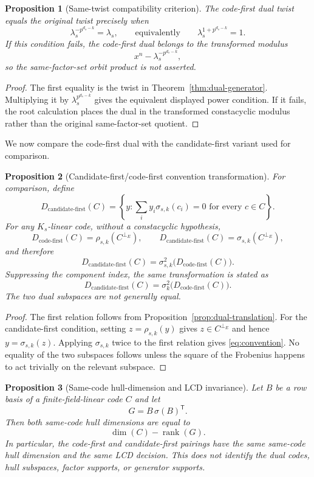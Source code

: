 \documentclass[11pt]{article}
\newcommand{\rank}{\operatorname{rank}}
\newcommand{\perpE}{\perp_E}
\newcommand{\CF}{\mathrm{code\text{-}first}}
\newcommand{\Candidate}{\mathrm{candidate\text{-}first}}
\theoremstyle{plain}
\newtheorem{proposition}{Proposition}
\theoremstyle{definition}
\theoremstyle{remark}
\begin{document}
\begin{proposition}[Same-twist compatibility criterion]\label{prop:same-twist}
The code-first dual twist equals the original twist precisely when
\[
\lambda_s^{-p^{d_s-k}}=\lambda_s,
\qquad\text{equivalently}\qquad
\lambda_s^{1+p^{d_s-k}}=1.
\]
If this condition fails, the code-first dual belongs to the transformed modulus
\[
x^n-\lambda_s^{-p^{d_s-k}},
\]
so the same-factor-set orbit product is not asserted.
\end{proposition}

\begin{proof}
The first equality is the twist in Theorem~\ref{thm:dual-generator}. Multiplying it by $\lambda_s^{p^{d_s-k}}$ gives the equivalent displayed power condition. If it fails, the root calculation places the dual in the transformed constacyclic modulus rather than the original same-factor-set quotient.
\end{proof}

We now compare the code-first dual with the candidate-first variant used for comparison.

\begin{proposition}[Candidate-first/code-first convention transformation]\label{prop:convention}
For comparison, define
\[
D_{\Candidate}(C)=\left\{y:\sum_i y_i\sigma_{s,k}(c_i)=0\text{ for every }c\in C\right\}.
\]
For any $K_s$-linear code, without a constacyclic hypothesis,
\[
D_{\CF}(C)=\rho_{s,k}(C^{\perpE}),
\qquad
D_{\Candidate}(C)=\sigma_{s,k}(C^{\perpE}),
\]
and therefore
\begin{equation}\label{eq:convention}
D_{\Candidate}(C)=\sigma_{s,k}^{2}\bigl(D_{\CF}(C)\bigr).
\end{equation}
Suppressing the component index, the same transformation is stated as
\[
D_{\Candidate}(C)=\sigma_k^2\bigl(D_{\CF}(C)\bigr).
\]
The two dual subspaces are not generally equal.
\end{proposition}

\begin{proof}
The first relation follows from Proposition~\ref{prop:dual-translation}. For the candidate-first condition, setting $z=\rho_{s,k}(y)$ gives $z\in C^{\perpE}$ and hence $y=\sigma_{s,k}(z)$. Applying $\sigma_{s,k}$ twice to the first relation gives \eqref{eq:convention}. No equality of the two subspaces follows unless the square of the Frobenius happens to act trivially on the relevant subspace.
\end{proof}

\begin{proposition}[Same-code hull-dimension and LCD invariance]\label{prop:gram-invariance}
Let $B$ be a row basis of a finite-field-linear code $C$ and let
\[
G=B\,\sigma(B)^{\mathsf T}.
\]
Then both same-code hull dimensions are equal to
\[
\dim(C)-\rank(G).
\]
In particular, the code-first and candidate-first pairings have the same same-code hull dimension and the same LCD decision. This does not identify the dual codes, hull subspaces, factor supports, or generator supports.
\end{proposition}
\end{document}
